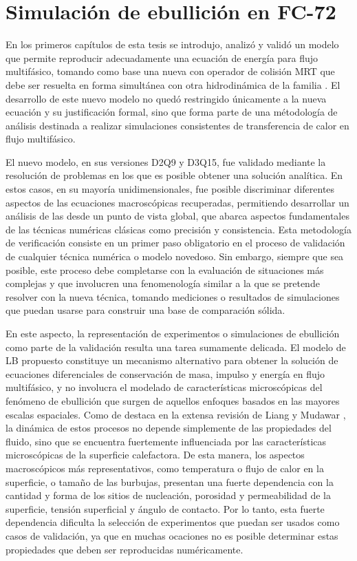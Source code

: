 \chapter{Simulaci\'on de ebullici\'on en FC-72}

En los primeros cap\'itulos de esta tesis se introdujo, analiz\'o y valid\'o un modelo que permite reproducir adecuadamente una ecuaci\'on de energ\'ia para flujo multif\'asico, tomando como base una nueva \lbe{} con operador de colisi\'on MRT que debe ser resuelta en forma simult\'anea con otra \lbe{} hidrodin\'amica de la familia \pp{}. El desarrollo de este nuevo modelo no qued\'o restringido \'unicamente a la nueva ecuaci\'on y su justificaci\'on formal, sino que forma parte de una m\'etodolog\'ia de an\'alisis destinada a realizar simulaciones consistentes de transferencia de calor en flujo multif\'asico.

El nuevo modelo, en sus versiones D2Q9 y D3Q15, fue validado mediante la resoluci\'on de problemas en los que es posible obtener una soluci\'on anal\'itica. En estos casos, en su mayor\'ia unidimensionales, fue posible discriminar diferentes aspectos de las ecuaciones macrosc\'opicas recuperadas, permitiendo desarrollar un an\'alisis de las \lbe{} desde un punto de vista global, que abarca aspectos fundamentales de las t\'ecnicas num\'ericas cl\'asicas como precisi\'on y consistencia. Esta metodolog\'ia de verificaci\'on consiste en un primer paso obligatorio en el proceso de validaci\'on de cualquier t\'ecnica num\'erica o modelo novedoso. Sin embargo, siempre que sea posible, este proceso debe completarse con la evaluaci\'on de situaciones m\'as complejas y que involucren una fenomenolog\'ia similar a la que se pretende resolver con la nueva t\'ecnica, tomando mediciones o resultados de simulaciones que puedan usarse para construir una base de comparaci\'on s\'olida.

En este aspecto, la representaci\'on de experimentos o simulaciones de ebullici\'on como parte de la validaci\'on resulta una tarea sumamente delicada. El modelo de LB propuesto constituye un mecanismo alternativo para obtener la soluci\'on de ecuaciones diferenciales de conservaci\'on de masa, impulso y energ\'ia en flujo multif\'asico, y no involucra el modelado de caracter\'isticas microsc\'opicas del fen\'omeno de ebullici\'on que surgen de aquellos enfoques basados en las mayores escalas espaciales. Como de destaca en la extensa revisi\'on de Liang y Mudawar \cite{liang_review_2019}, la din\'amica de estos procesos no depende simplemente de las propiedades del fluido, sino que se encuentra fuertemente influenciada por las caracter\'isticas microsc\'opicas de la superficie calefactora. De esta manera, los aspectos macrosc\'opicos m\'as representativos, como temperatura o flujo de calor en la superficie, o tama\~no de las burbujas, presentan una fuerte dependencia con la cantidad y forma de los sitios de nucleaci\'on, porosidad y permeabilidad de la superficie, tensi\'on superficial y \'angulo de contacto. Por lo tanto, esta fuerte dependencia dificulta la selecci\'on de experimentos que puedan ser usados como casos de validaci\'on, ya que en muchas ocaciones no es posible determinar estas propiedades que deben ser reproducidas num\'ericamente.

